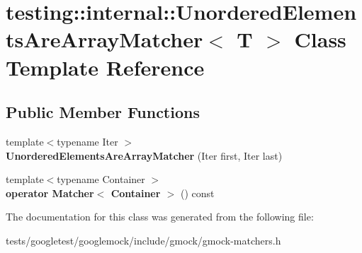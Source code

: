\hypertarget{classtesting_1_1internal_1_1UnorderedElementsAreArrayMatcher}{}\section{testing\+:\+:internal\+:\+:Unordered\+Elements\+Are\+Array\+Matcher$<$ T $>$ Class Template Reference}
\label{classtesting_1_1internal_1_1UnorderedElementsAreArrayMatcher}
\subsection*{Public Member Functions}
\begin{DoxyCompactItemize}
\item 
\mbox{\label{classtesting_1_1internal_1_1UnorderedElementsAreArrayMatcher_a5a91694cf5088cb0b7f4b1bb57dee957}} 
{\footnotesize template$<$typename Iter $>$ }\\{\bfseries Unordered\+Elements\+Are\+Array\+Matcher} (Iter first, Iter last)
\item 
\mbox{\label{classtesting_1_1internal_1_1UnorderedElementsAreArrayMatcher_ab09b91c39147c51f9c970fd155f2da77}} 
{\footnotesize template$<$typename Container $>$ }\\{\bfseries operator Matcher$<$ Container $>$} () const
\end{DoxyCompactItemize}


The documentation for this class was generated from the following file\+:\begin{DoxyCompactItemize}
\item 
tests/googletest/googlemock/include/gmock/gmock-\/matchers.\+h\end{DoxyCompactItemize}
